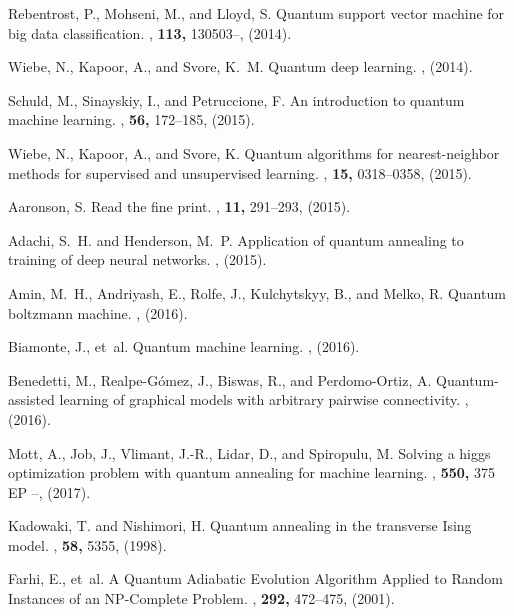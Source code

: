 \documentclass[aps,pra,groupedaddress,nofootinbib,notitlepage,showpacs,floatfix,superscriptaddress]{revtex4-1}
\begin{document}
\begin{thebibliography}{10}
Rebentrost, P., Mohseni, M., and Lloyd, S.
\newblock Quantum support vector machine for big data classification.
, {\bf 113,} 130503--, (2014).

Wiebe, N., Kapoor, A., and Svore, K.~M.
\newblock Quantum deep learning.
, (2014).

Schuld, M., Sinayskiy, I., and Petruccione, F.
\newblock An introduction to quantum machine learning.
, {\bf 56,} 172--185, (2015).

Wiebe, N., Kapoor, A., and Svore, K.
\newblock Quantum algorithms for nearest-neighbor methods for supervised and
  unsupervised learning.
, {\bf 15,} 0318--0358,
  (2015).

Aaronson, S.
\newblock Read the fine print.
, {\bf 11,} 291--293, (2015).

Adachi, S.~H. and Henderson, M.~P.
\newblock Application of quantum annealing to training of deep neural networks.
, (2015).

Amin, M.~H., Andriyash, E., Rolfe, J., Kulchytskyy, B., and Melko, R.
\newblock Quantum boltzmann machine.
, (2016).

Biamonte, J., et~al.
\newblock Quantum machine learning.
, (2016).

Benedetti, M., Realpe-G{\'o}mez, J., Biswas, R., and Perdomo-Ortiz, A.
\newblock Quantum-assisted learning of graphical models with arbitrary pairwise
  connectivity.
, (2016).

Mott, A., Job, J., Vlimant, J.-R., Lidar, D., and Spiropulu, M.
\newblock Solving a higgs optimization problem with quantum annealing for
  machine learning.
, {\bf 550,} 375 EP --, (2017).

Kadowaki, T. and Nishimori, H.
\newblock Quantum annealing in the transverse \uppercase{I}sing model.
, {\bf 58,} 5355, (1998).

Farhi, E., et~al.
\newblock A {Quantum} {Adiabatic} {Evolution} {Algorithm} {Applied} to {Random}
  {Instances} of an {NP}-{Complete} {Problem}.
, {\bf 292,} 472--475, (2001).


\end{thebibliography}
\end{document}
